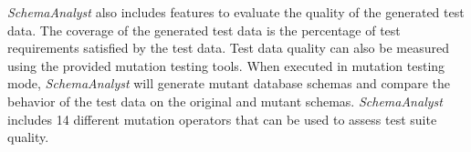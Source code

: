 \textit{SchemaAnalyst} also includes features to evaluate the quality of the generated test data. The
coverage of the generated test data is the percentage of test requirements satisfied by the test data. 
Test data quality can also be measured using the provided mutation testing tools. When executed in
mutation testing mode, \textit{SchemaAnalyst} will generate mutant database schemas and compare the
behavior of the test data on the original and mutant schemas. \textit{SchemaAnalyst} includes 14
different mutation operators that can be used to assess test suite quality.



